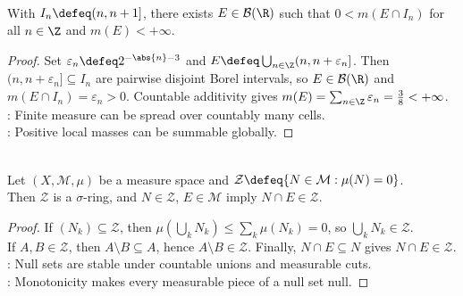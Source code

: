 \begin{proposition} \label{prop:finite-measure-meets-every-unit-interval} \\
With $I_n\defeq(n,n+1]$, there exists $E\in\mathcal{B}(\R)$ such that $0<m(E\cap I_n)$ for all $n\in\Z$ and $m(E)<+\infty$.
\begin{proof}
Set $\varepsilon_n\defeq2^{-\abs{n}-3}$ and $E\defeq\bigcup_{n\in\Z}(n,n+\varepsilon_n]$. Then $(n,n+\varepsilon_n]\subseteq I_n$ are pairwise disjoint Borel intervals, so $E\in\mathcal{B}(\R)$ and $m(E\cap I_n)=\varepsilon_n>0$. Countable additivity gives $m(E)=\sum_{n\in\Z}\varepsilon_n=\frac38<+\infty$.\\
: Finite measure can be spread over countably many cells.\\
: Positive local masses can be summable globally.
\end{proof}
\end{proposition}

\begin{proposition} \label{prop:null-sets-sigma-ideal} \\
Let $(X,\mathcal{M},\mu)$ be a measure space and $\mathcal{Z}\defeq\{N\in\mathcal{M}:\mu(N)=0\}$.\\
Then $\mathcal{Z}$ is a $\sigma$-ring, and $N\in\mathcal{Z}$, $E\in\mathcal{M}$ imply $N\cap E\in\mathcal{Z}$.
\begin{proof}
If $(N_k)\subseteq\mathcal{Z}$, then $\mu(\bigcup_kN_k)\leq\sum_k\mu(N_k)=0$, so $\bigcup_kN_k\in\mathcal{Z}$.\\
If $A,B\in\mathcal{Z}$, then $A\setminus B\subseteq A$, hence $A\setminus B\in\mathcal{Z}$. Finally, $N\cap E\subseteq N$ gives $N\cap E\in\mathcal{Z}$.\\
: Null sets are stable under countable unions and measurable cuts.\\
: Monotonicity makes every measurable piece of a null set null.
\end{proof}
\end{proposition}

